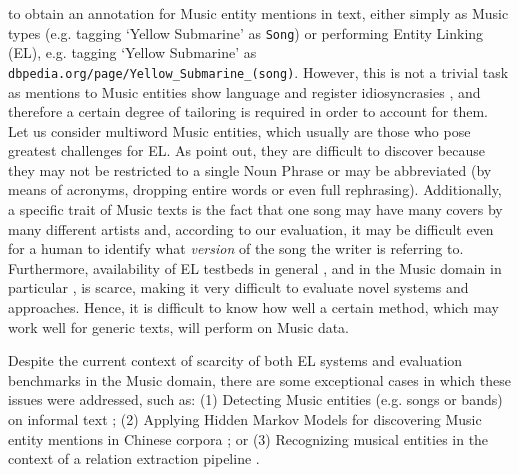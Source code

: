 to obtain an annotation for Music entity mentions in text, either simply as Music types (e.g. tagging `Yellow Submarine' as \texttt{Song}) or performing Entity Linking (EL), e.g. tagging `Yellow Submarine' as \texttt{dbpedia.org/page/Yellow\_Submarine\_(song)}. However, this is not a trivial task as mentions to Music entities show language and register idiosyncrasies \cite{TataandDiEugenio2010,Gruhl2009}, and therefore a certain degree of tailoring is required in order to account for them. Let us consider multiword Music entities, which usually are those who pose greatest challenges for EL. As \cite{TataandDiEugenio2010} point out, they are difficult to discover because they may not be restricted to a single Noun Phrase or may be abbreviated (by means of acronyms, dropping entire words or even full rephrasing). Additionally, a specific trait of Music texts is the fact that one song may have many covers by many different artists and, according to our evaluation, it may be difficult even for a human to identify what \textit{version} of the song the writer is referring to. Furthermore, availability of EL testbeds in general \cite{Usbeck2015}, and in the Music domain in particular \cite{Gruhl2009}, is scarce, making it very difficult to evaluate novel systems and approaches. Hence, it is difficult to know how well a certain method, which may work well for generic texts, will perform on Music data.


Despite the current context of scarcity of both EL systems and evaluation benchmarks in the Music domain, there are some exceptional cases in which these issues were addressed, such as: (1) Detecting Music entities (e.g. songs or bands) on informal text \cite{Gruhl2009}; (2) Applying Hidden Markov Models for discovering Music entity mentions in Chinese corpora \cite{Zhang2009}; or (3) Recognizing musical entities in the context of a relation extraction pipeline \cite{Oramas2015}. 

